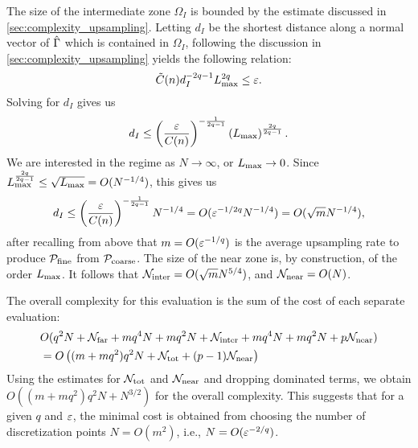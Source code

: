 The size of the intermediate zone $\Omega_I$ is bounded by the estimate discussed in \cref{sec:complexity_upsampling}.
Letting $d_I$ be the shortest distance along a normal vector of $\hat{\Gamma}$ which is contained in $\Omega_I$, following the discussion in \cref{sec:complexity_upsampling} yields the following relation:
\begin{equation}
  \tilde{C}(n) d_I^{-2q-1} L_{\mathrm{max}}^{2q} \leq \varepsilon.
\end{equation}
Solving for $d_I$ gives us
\begin{equation}
  d_I \leq \left(\frac{\varepsilon}{C(n)}\right)^{-\frac{1}{2q-1}} \left(L_{\mathrm{max}}\right)^{\frac{2q}{2q-1}}.
\end{equation}
We are interested in the regime as $N \to \infty$, or $L_{\mathrm{max}} \to 0$.
Since $L_{\mathrm{max}}^{\frac{2q}{2q-1}} \leq \sqrt{L_{\mathrm{max}}} = O(N^{-1/4})$, this gives us 
\begin{equation}
  d_I \leq \left(\frac{\varepsilon}{C(n)}\right)^{-\frac{1}{2q-1}} N^{-1/4} = O(\varepsilon^{-1/2q}N^{-1/4}) = O(\sqrt{m}N^{-1/4}),
\end{equation}
after recalling from above that $m = O(\varepsilon^{-1/q})$ is the average upsampling rate to produce ${\mathcal{P}_{\mathrm{fine}}}$ from ${\mathcal{P}_{\mathrm{coarse}}}$.
The size of the near zone is, by construction, of the order $L_{\mathrm{max}}$.
It follows that $\mathcal{N}_{\mathrm{inter}} =O(  \sqrt{m} N^{5/4})$, and $\mathcal{N}_{\mathrm{near}} =O(N)$.

The overall complexity for this evaluation is the sum of the cost of each separate evaluation: 
\begin{align*}
  &O(q^2N + \mathcal{N}_{\mathrm{far}} + mq^4 N + mq^2 N + \mathcal{N}_{\mathrm{inter}} + mq^4 N + mq^2N + p\mathcal{N}_{\mathrm{near}})\\
  &= O\left( (m+mq^2)q^2N + \mathcal{N}_{\mathrm{tot}} + (p-1)\mathcal{N}_{\mathrm{near}} \right)
\end{align*}
Using the estimates for $\mathcal{N}_{\mathrm{tot}}$ and $\mathcal{N}_{\mathrm{near}}$ and dropping dominated terms, we obtain  $O( (m + m q^2)q^2 N + N^{3/2})$ for the overall complexity.
This suggests that for a given $q$ and $\varepsilon$, the minimal cost is obtained from choosing the number of discretization points 
$N =O(m^2)$, i.e., $ N = O(\varepsilon^{-2/q})$. 





